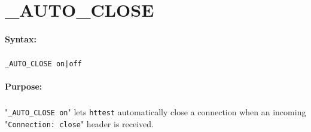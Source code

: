 
\newpage
\section{\_AUTO\_CLOSE}
\label{cmd:_AUTO_CLOSE}

\paragraph{Syntax:}
\subparagraph{}
\texttt{\_AUTO\_CLOSE on|off}

\paragraph{Purpose:}
\subparagraph{}
"\texttt{\_AUTO\_CLOSE on}" lets \texttt{httest} automatically 
close a connection when an incoming "\texttt{Connection: close}" 
header is received.